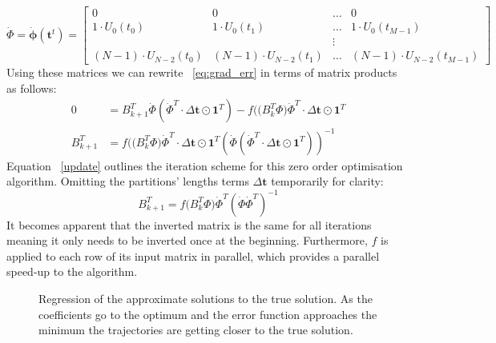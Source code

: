 \documentclass[11pt]{article}
\begin{document}
    \begin{equation*}
        \label{DPHI}
        \dot{\Phi} = \pmb{\dot\phi}(\pmb{t}^t) =
        \begin{bmatrix}
            0                        & 0                        & \dots & 0                            \\
            1\cdot U_0(t_0)          & 1\cdot U_0(t_1)          & \dots & 1\cdot U_0(t_{M-1})          \\
            & & \vdots \\
            (N-1) \cdot U_{N-2}(t_0) & (N-1) \cdot U_{N-2}(t_1) & \dots & (N-1) \cdot U_{N-2}(t_{M-1})
        \end{bmatrix}
    \end{equation*}
    Using these matrices we can rewrite ~\ref{eq:grad_err} in terms of matrix products as follows:
    \begin{align}
        0 &=
        B_{k+1}^T \dot\Phi (\dot\Phi^T \cdot \Delta \pmb{t} \odot \pmb{1}^T  ) -
        f \big( (B_{k}^T \Phi \big) {\dot\Phi}^T \cdot \Delta \pmb{t} \odot \pmb{1}^T
        \\
        B_{k+1}^T &=
        f \big( (B_{k}^T \Phi \big) {\dot\Phi}^T \cdot \Delta \pmb{t} \odot \pmb{1}^T
        ( \dot\Phi (\dot\Phi^T \cdot \Delta \pmb{t} \odot \pmb{1}^T ) )^{-1} \label{update}
    \end{align}
    Equation ~\ref{update} outlines the iteration scheme for this zero order optimisation algorithm.
    Omitting the partitions' lengths terms $\Delta \pmb{t}$ temporarily for clarity:
    \begin{equation*}
        B_{k+1}^T =
        f \big( B_{k}^T \Phi \big) {\dot\Phi}^T
        ( \dot\Phi \dot\Phi^T )^{-1}
    \end{equation*}
    It becomes apparent that the inverted matrix is the same for all iterations meaning it only needs to be inverted
    once at the beginning.
    Furthermore, $f$ is applied to each row of its input matrix in parallel, which provides a parallel speed-up to
    the algorithm.

    \begin{figure}[H]
        \begin{center}
            
        \end{center}
        \caption{ Regression of the approximate solutions to the true solution. As the coefficients go to the
        optimum and the error function approaches the minimum the trajectories are getting closer to the true solution.}
        \label{fig:reg_sol}
    \end{figure}
\end{document}
